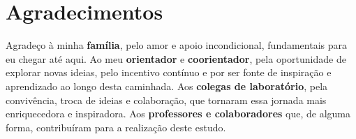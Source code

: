 \chapter*{Agradecimentos}

Agradeço à minha \textbf{família}, pelo amor e apoio incondicional, fundamentais para eu chegar até aqui.  
Ao meu \textbf{orientador} e \textbf{coorientador}, pela oportunidade de explorar novas ideias, pelo incentivo contínuo e por ser fonte de inspiração e aprendizado ao longo desta caminhada.  
Aos \textbf{colegas de laboratório}, pela convivência, troca de ideias e colaboração, que tornaram essa jornada mais enriquecedora e inspiradora.  
Aos \textbf{professores e colaboradores} que, de alguma forma, contribuíram para a realização deste estudo.
